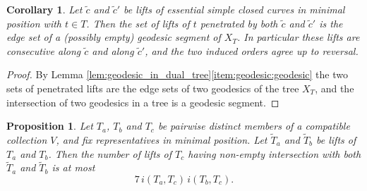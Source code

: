 \documentclass[12pt,a4paper]{amsart}
\numberwithin{equation}{section}
\theoremstyle{plain}
\newtheorem{proposition}[theorem]{Proposition}
\newtheorem{corollary}[theorem]{Corollary}
\theoremstyle{definition}
\theoremstyle{remark}
\begin{document}
\begin{corollary} \label{cor:common_block}
    Let $\tilde c$ and $\tilde c'$ be lifts of essential simple closed curves in minimal position with $t \in T$.
    Then the set of lifts of $t$ penetrated by both $\tilde c$ and $\tilde c'$ is the edge set of a (possibly empty) geodesic segment of $X_T$.
    In particular these lifts are consecutive along $\tilde c$ and along $\tilde c'$, and the two induced orders agree up to reversal.
\end{corollary}

\begin{proof}
    By Lemma \ref{lem:geodesic_in_dual_tree}\eqref{item:geodesic:geodesic} the two sets of penetrated lifts are the edge sets of two geodesics of the tree $X_T$, and the intersection of two geodesics in a tree is a geodesic segment.
\end{proof}

\begin{proposition} \label{prop:two_cylinders}
    Let $T_a$, $T_b$ and $T_c$ be pairwise distinct members of a compatible collection $V$, and fix representatives in minimal position.
    Let $\tilde T_a$ and $\tilde T_b$ be lifts of $T_a$ and $T_b$.
    Then the number of lifts of $T_c$ having non-empty intersection with both $\tilde T_a$ and $\tilde T_b$ is at most
    \[
        7 \, i(T_a, T_c) \, i(T_b, T_c) .
    \]
\end{proposition}
\end{document}
